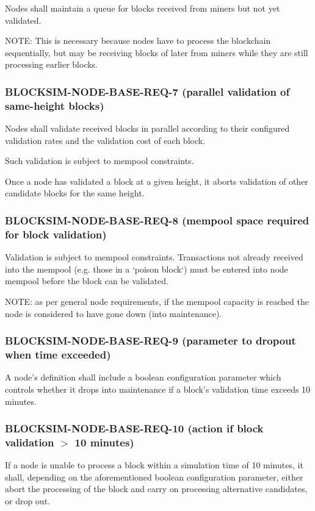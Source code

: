 \documentclass{scrreprt}
\begin{document}
Nodes shall maintain a queue for blocks received from miners but not
yet validated.

NOTE: This is necessary because nodes have to process the blockchain
sequentially, but may be receiving blocks of later from miners while they
are still processing earlier blocks.


\subsubsection{BLOCKSIM-NODE-BASE-REQ-7 (parallel validation of same-height blocks)}

Nodes shall validate received blocks in parallel according to their
configured validation rates and the validation cost of each block.

Such validation is subject to mempool constraints.

Once a node has validated a block at a given height, it aborts validation
of other candidate blocks for the same height.


\subsubsection{BLOCKSIM-NODE-BASE-REQ-8 (mempool space required for block validation)}

Validation is subject to mempool constraints.
Transactions not already received into the mempool (e.g. those in a `poison block`)
must be entered into node mempool before the block can be validated.

NOTE: as per general node requirements, if the mempool capacity is reached
the node is considered to have gone down (into maintenance).


\subsubsection{BLOCKSIM-NODE-BASE-REQ-9 (parameter to dropout when time exceeded)}

A node's definition shall include a boolean configuration parameter which
controls whether it drops into maintenance if a block's validation time exceeds 10 minutes.


\subsubsection{BLOCKSIM-NODE-BASE-REQ-10 (action if block validation $>$ 10 minutes)}

If a node is unable to process a block within a simulation time of 10 minutes,
it shall, depending on the aforementioned  boolean configuration parameter,
either abort the processing of the block and carry on processing alternative
candidates, or drop out.
\end{document}
